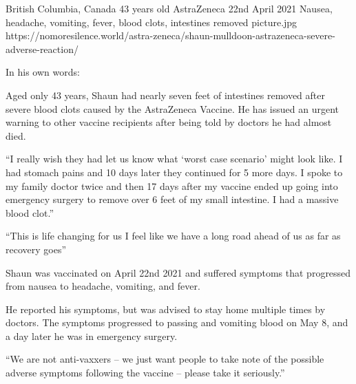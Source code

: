 {British Columbia, Canada}
{43 years old}
{AstraZeneca}
{22nd April 2021}
{Nausea, headache, vomiting, fever, blood clots, intestines removed}
{picture.jpg}
{https://nomoresilence.world/astra-zeneca/shaun-mulldoon-astrazeneca-severe-adverse-reaction/}
{

In his own words:

Aged only 43 years, Shaun had nearly seven feet of intestines removed after
severe blood clots caused by the AstraZeneca Vaccine. He has issued an urgent
warning to other vaccine recipients after being told by doctors he had almost
died.

“I really wish they had let us know what ‘worst case scenario’ might look
like. I had stomach pains and 10 days later they continued for 5 more days. I
spoke to my family doctor twice and then 17 days after my vaccine ended up going
into emergency surgery to remove over 6 feet of my small intestine. I had a
massive blood clot.”

“This is life changing for us I feel like we have a long road ahead of us as far
as recovery goes”

Shaun was vaccinated on April 22nd 2021 and suffered symptoms that progressed
from nausea to headache, vomiting, and fever.

He reported his symptoms, but was advised to stay home multiple times by
doctors. The symptoms progressed to passing and vomiting blood on May 8, and a
day later he was in emergency surgery.

“We are not anti-vaxxers – we just want people to take note of the possible
adverse symptoms following the vaccine – please take it seriously.”

}
